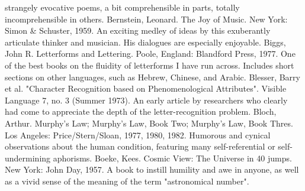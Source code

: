  strangely evocative poems, a bit comprehensible in parts, totally incomprehensible in
 others.
Bernstein, Leonard. The Joy of Music. New York: Simon \& Schuster, 1959. An exciting
 medley of ideas by this exuberantly articulate thinker and musician. His dialogues are
 especially enjoyable.
Biggs, John R. Letterforms and Lettering. Poole, England: Blandford Press, 1977. One of the
 best books on the fluidity of letterforms I have run across. Includes short sections on other
 languages, such as Hebrew, Chinese, and Arabic.
Blesser, Barry et al. "Character Recognition based on Phenomenological Attributes". Visible
 Language 7, no. 3 (Summer 1973). An early article by researchers who clearly had come to
 appreciate the depth of the letter-recognition problem.
Bloch, Arthur. Murphy's Law; Murphy's Law, Book Two; Murphy's Law, Book Thres. Los
 Angeles: Price/Stern/Sloan, 1977, 1980, 1982. Humorous and cynical observations about
 the human condition, featuring many self-referential or self-undermining aphorisms.
Boeke, Kees. Cosmic View: The Universe in 40 jumps. New York: John Day, 1957. A book
 to instill humility and awe in anyone, as well as a vivid sense of the meaning of the term
 "astronomical number".


